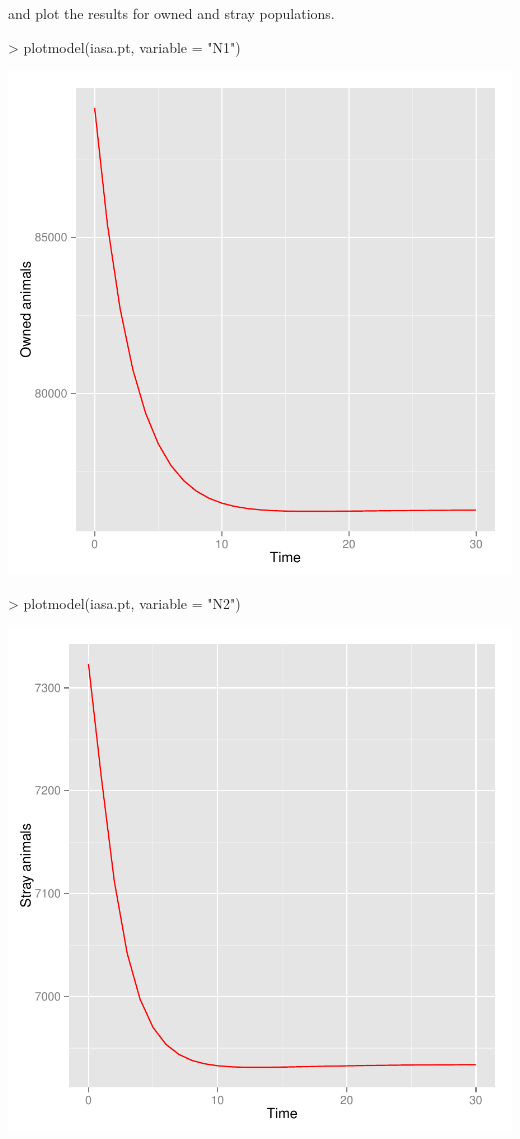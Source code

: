 \documentclass[a4paper]{article}
\begin{document}
and plot the results for owned and stray populations.
\begin{Schunk}
\begin{Sinput}
> plotmodel(iasa.pt, variable = "N1")
\end{Sinput}
\end{Schunk}
\begin{center}
\includegraphics{capm_example-028}
\end{center}
\begin{Schunk}
\begin{Sinput}
> plotmodel(iasa.pt, variable = "N2")
\end{Sinput}
\end{Schunk}
\begin{center}
\includegraphics{capm_example-030}
\end{center}
\end{document}
